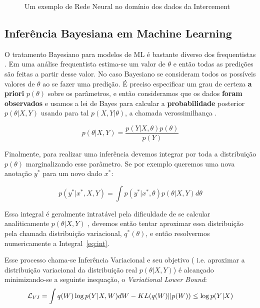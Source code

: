 \begin{figure}
  \centering
  
  \caption{Um exemplo de Rede Neural no domínio dos dados da Intercement}
  \label{fig:nn}
\end{figure}


\bigskip


\subsection{Inferência Bayesiana em Machine Learning}
\label{sec:bayesinf}
O tratamento Bayesiano para modelos de ML é bastante diverso dos frequentistas \citep{dlbook}.
Em uma análise frequentista estima-se um valor de $\theta$ e então todas as
predições são feitas a partir desse valor. No caso Bayesiano se consideram todos
os possíveis valores de $\theta$ ao se fazer uma predição. É preciso especificar
um grau de certeza \textbf{a priori} $p(\theta)$ sobre os parâmetros, e então
consideramos que os dados \textbf{foram observados} e usamos a lei de Bayes para
calcular a \textbf{probabilidade} posterior $p(\theta | X,Y)$ usando para tal
$p(X,Y | \theta)$, a chamada verossimilhança \citep{bayesml}. 

\[    p(\theta | X,Y) = \frac{p(Y| X,\theta) p(\theta)}{p(Y)}   \]

Finalmente, para realizar uma inferência devemos integrar por toda a distribuição $p(\theta)$ marginalizando esse parâmetro. Se por exemplo queremos uma nova anotação $y^*$ para um novo dado $x^*$:


\begin{equation}
  \label{eq:int}
p(y^* | x^* , X,Y) = \int  p(y^* | x^*,\theta) p(\theta | X,Y)  d\theta 
\end{equation}

Essa integral é geralmente intratável pela dificuldade de se calcular
analiticamente $p(\theta | X,Y)$ \citep{ubertime}, devemos então tentar aproximar essa distribuição
pela chamada distribuição variacional, $q^*(\theta)$, e então resolvermos numericamente a Integral~\ref{eq:int}.

Esse processo chama-se Inferência Variacional e seu objetivo ( i.e. aproximar a distribuição variacional da distribuição real $p(\theta | X,Y)$)
é alcançado minimizando-se a seguinte inequação, o \textit{Variational Lower Bound}: \\

\begin{equation}
  \label {eq:ine}
  \mathcal{L}_{VI} = \int q(W) \log p(Y | X,W)dW - \mathnormal{KL}(q(W) ||p(W)) \\
                  \leq \log p(Y|X) 
\end{equation}


